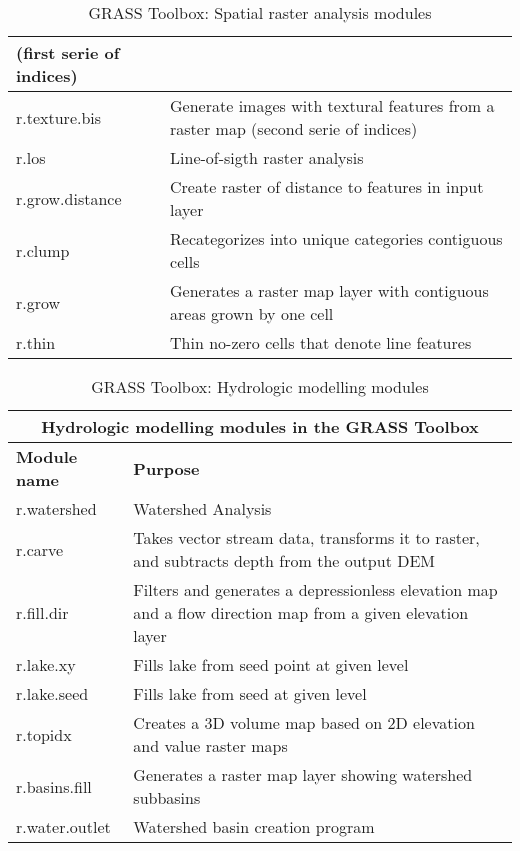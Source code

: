 \begin{table}[H]
\begin{tabular}{|p{4cm}|p{10cm}|}
  (first serie of indices)\\
  \hline r.texture.bis & Generate images with textural features from a raster
  map (second serie of indices)\\
  \hline r.los & Line-of-sigth raster analysis \\
  \hline r.grow.distance & Create raster of distance to features in input layer \\
  \hline r.clump & Recategorizes into unique categories contiguous cells \\
  \hline r.grow & Generates a raster map layer with contiguous areas grown by
  one cell\\
  \hline r.thin & Thin no-zero cells that denote line features \\
\hline
\end{tabular}
\caption{GRASS Toolbox: Spatial raster analysis modules}
\end{table}

\begin{table}[H]
\centering
 \begin{tabular}{|p{4cm}|p{10cm}|}
  \hline \multicolumn{2}{|c|}{\textbf{Hydrologic modelling modules in the GRASS
  Toolbox}} \\
  \hline \textbf{Module name} & \textbf{Purpose} \\
  \hline r.watershed & Watershed Analysis \\
  \hline r.carve & Takes vector stream data, transforms it to raster, and
  subtracts depth from the output DEM \\
  \hline r.fill.dir & Filters and generates a depressionless elevation map
  and a flow direction map from a given elevation layer \\
  \hline r.lake.xy & Fills lake from seed point at given level \\
  \hline r.lake.seed & Fills lake from seed at given level \\
  \hline r.topidx & Creates a 3D volume map based on 2D elevation and value
  raster maps \\
  \hline r.basins.fill & Generates a raster map layer showing watershed
  subbasins \\
  \hline r.water.outlet & Watershed basin creation program \\
\hline
\end{tabular}
\caption{GRASS Toolbox: Hydrologic modelling modules}
\end{table}

